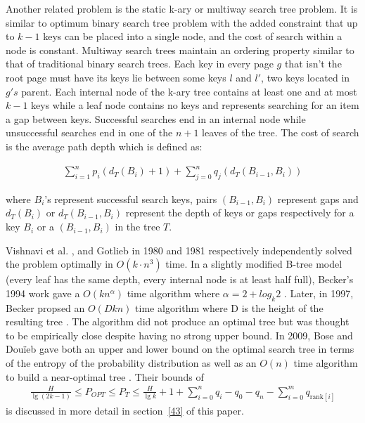 \documentclass[letterpaper,12pt,titlepage,oneside,final]{book}
\theoremstyle{plain}
\begin{document}
Another related problem is the static k-ary or multiway search tree problem. It is similar to optimum binary search tree problem with the added constraint that up to $k-1$ keys can be placed into a single node, and the cost of search within a node is constant. Multiway search trees maintain an ordering property similar to that of traditional binary search trees. Each key in every page $g$ that isn't the root page must have its keys lie between some keys $l$ and $l'$, two keys located in $g's$ parent. Each internal node of the k-ary tree contains at least one and at most $k-1$ keys while a leaf node contains no keys and represents searching for an item a gap between keys. Successful searches end in an internal node while unsuccessful searches end in one of the $n+1$ leaves of the tree. The cost of search is the average path depth which is defined as:

\begin{align*}
\sum_{i=1}^{n} p_i(d_T(B_i)+1) + \sum_{j=0}^{n} q_j(d_T(B_{i-1},B_i))
\end{align*}

\noindent where $B_i$'s represent successful search keys, pairs $(B_{i-1},B_i)$ represent gaps and $d_T(B_i)$  or $d_T(B_{i-1},B_i)$ represent the depth of keys or gaps respectively for a key $B_i$ or a $(B_{i-1},B_i)$ in the tree $T$.

Vishnavi et al. \cite{vaishnavi1980optimum}, and Gotlieb  \cite{gotlieb1981optimal} in 1980 and 1981 respectively independently solved the problem optimally in $O(k\cdot n^3)$ time. In a slightly modified B-tree model (every leaf has the same depth, every internal node is at least half full), Becker's 1994 work gave a $O(kn^{\alpha})$ time algorithm where $\alpha=2+log_k 2$ \cite{becker1994new}. Later, in 1997, Becker propsed an $O(Dkn)$ time algorithm where D is the height of the resulting tree \cite{becker1997construction}. The algorithm did not produce an optimal tree but was thought to be empirically close despite having no strong upper bound. In 2009, Bose and Dou\"{i}eb gave both an upper and lower bound on the optimal search tree in terms of the entropy of the probability distribution as well as an $O(n)$ time algorithm to build a near-optimal tree \cite{bose2009efficient}. Their bounds of
\begin{align*}
\frac{H}{\lg(2k-1)} \leq P_{OPT} \leq P_T \leq \frac{H}{\lg k} + 1 + \sum_{i=0}^n q_i - q_0 - q_n - \sum_{i=0}^m q_{\text{rank}[i]}
\end{align*}
is discussed in more detail in section~\ref{43} of this paper.
\end{document}
